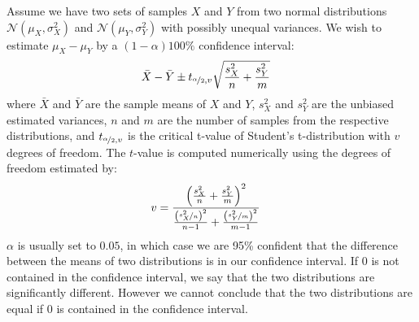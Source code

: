 \documentclass[thesis.tex]{subfiles}
\begin{document}
Assume we have two sets of samples $X$ and $Y$ from two normal distributions $\mathcal{N}(\mu_X,\sigma_X^2)$ and $\mathcal{N}(\mu_{Y},\sigma_Y^2)$ with possibly unequal variances. We wish to estimate $\mu_X - \mu_Y$ by a $(1-\alpha) 100\%$ confidence interval:
\begin{align*}
	\bar{X} - \bar{Y} &\pm t_{\nicefrac{\alpha}{2},v} \sqrt{\frac{s^2_X}{n} + \frac{s^2_Y}{m}}
\end{align*}
where $\bar{X}$ and $\bar{Y}$ are the sample means of $X$ and $Y$, $s^2_X$ and $s^2_Y$ are the unbiased estimated variances, $n$ and $m$ are the number of samples from the respective distributions, and $t_{\nicefrac{\alpha}{2},v}$ is the critical t-value of Student's t-distribution with $v$ degrees of freedom. The $t$-value is computed numerically using the degrees of freedom estimated by:
\begin{align*}
	v &= \frac{\left( \frac{s_X^2}{n} + \frac{s_Y^2}{m} \right)^2}{\frac{\left(\nicefrac{s_X^2}{n} \right)^2}{n-1} + \frac{\left(\nicefrac{s_Y^2}{m}\right)^2}{m-1}}
\end{align*}
$\alpha$ is usually set to $0.05$, in which case we are 95\% confident that the difference between the means of two distributions is in our confidence interval. If 0 is not contained in the confidence interval, we say that the two distributions are significantly different. However we cannot conclude that the two distributions are equal if 0 is contained in the confidence interval.

\subbibliography
\end{document}
